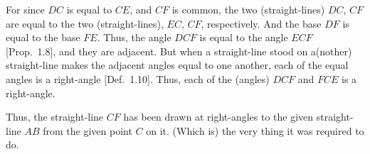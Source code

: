 \begin{Parallel}{}{}
{For since $DC$ is equal to $CE$, and $CF$ is common, the two (straight-lines) $DC$, $CF$
are equal to the two (straight-lines), $EC$, $CF$, respectively.  And the base $DF$
is equal to the base $FE$. Thus, the angle $DCF$ is equal to the
angle $ECF$ [Prop.~1.8], and they are adjacent. But when a straight-line stood on 
a(nother) straight-line makes the adjacent angles equal to one another, each of the
equal angles is a right-angle [Def.~1.10]. Thus, each of the (angles)
$DCF$ and $FCE$ is a right-angle.

Thus, the straight-line $CF$ has been drawn at right-angles to the
given straight-line $AB$ from the given point $C$ on it. (Which is) the very thing
it was required to do.}
\end{Parallel}

